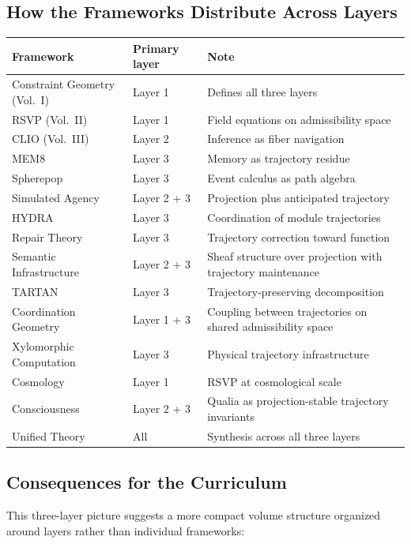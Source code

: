 \documentclass[11pt, a4paper]{article}
\begin{document}
\subsection{How the Frameworks Distribute Across Layers}

\medskip
\begin{longtable}{p{3.5cm}lp{6.5cm}}
\toprule
\textbf{Framework} & \textbf{Primary layer} & \textbf{Note} \\
\midrule
Constraint Geometry (Vol.~I) & Layer 1 & Defines all three layers \\
RSVP (Vol.~II) & Layer 1 & Field equations on admissibility space \\
CLIO (Vol.~III) & Layer 2 & Inference as fiber navigation \\
MEM\textbar{}8 & Layer 3 & Memory as trajectory residue \\
Spherepop & Layer 3 & Event calculus as path algebra \\
Simulated Agency & Layer 2 + 3 & Projection plus anticipated trajectory \\
HYDRA & Layer 3 & Coordination of module trajectories \\
Repair Theory & Layer 3 & Trajectory correction toward function \\
Semantic Infrastructure & Layer 2 + 3 & Sheaf structure over projection
  with trajectory maintenance \\
TARTAN & Layer 3 & Trajectory-preserving decomposition \\
Coordination Geometry & Layer 1 + 3 & Coupling between trajectories
  on shared admissibility space \\
Xylomorphic Computation & Layer 3 & Physical trajectory infrastructure \\
Cosmology & Layer 1 & RSVP at cosmological scale \\
Consciousness & Layer 2 + 3 & Qualia as projection-stable trajectory
  invariants \\
Unified Theory & All & Synthesis across all three layers \\
\bottomrule
\end{longtable}

\subsection{Consequences for the Curriculum}

This three-layer picture suggests a more compact volume structure
organized around layers rather than individual frameworks:
\end{document}
